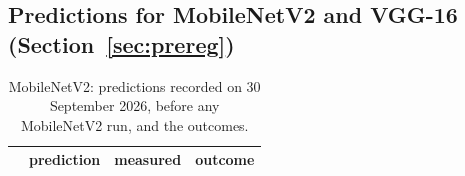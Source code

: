 \documentclass[10pt,a4paper]{article}
\begin{document}
\begin{table}[!htbp]\centering\small
\caption{MobileNetV2: routing entropy against the benefit over
\texttt{uniform}, for every \texttt{gap} group that has a \texttt{uniform}
arm. RMS dev is recovered from Eq.~\eqref{eq:ent} as in
Table~\ref{tab:entben}. Flat layers: dynamic layers (of )
with $\tilde H\ge0.9999$, range over seeds.}
\label{tab:mbentben}
\end{table}

\begin{table}[!htbp]\centering\small
\caption{VGG-16: routing entropy against the benefit over
\texttt{uniform}, for every \texttt{gap} group that has a \texttt{uniform}
arm. RMS dev is recovered from Eq.~\eqref{eq:ent} as in
Table~\ref{tab:entben}. Flat layers: dynamic layers (of )
with $\tilde H\ge0.9999$, range over seeds.}
\label{tab:vgentben}
\end{table}

\FloatBarrier

\subsection{Predictions for MobileNetV2 and VGG-16 (Section~\ref{sec:prereg})}

\begin{table}[!htbp]\centering\small
\caption{MobileNetV2: predictions recorded on 30 September 2026, before
any MobileNetV2 run, and the outcomes.}
\label{tab:mbprereg}
\begin{tabular}{l p{8.2cm} l l}
\toprule
& prediction & measured & outcome \\
\midrule
\bottomrule
\end{tabular}
\end{table}
\end{document}
